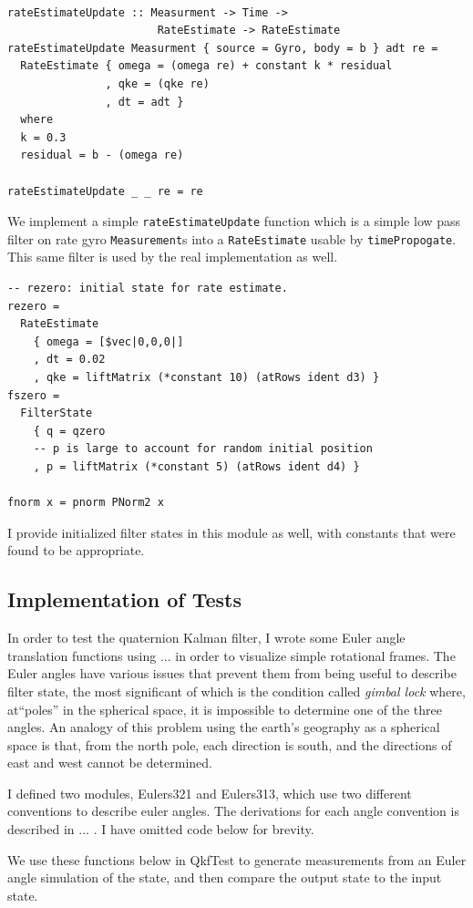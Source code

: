 \documentclass[12pt]{report}
\begin{document}
\begin{lstlisting}

rateEstimateUpdate :: Measurment -> Time -> 
                       RateEstimate -> RateEstimate
rateEstimateUpdate Measurment { source = Gyro, body = b } adt re = 
  RateEstimate { omega = (omega re) + constant k * residual
               , qke = (qke re)
               , dt = adt }
  where 
  k = 0.3
  residual = b - (omega re)

rateEstimateUpdate _ _ re = re 
\end{lstlisting}
We implement a simple \lstinline$rateEstimateUpdate$ function which is a simple low pass filter on rate gyro \lstinline$Measurement$s into a \lstinline$RateEstimate$ usable by \lstinline$timePropogate$. This same filter is used by the real implementation as well.
\begin{lstlisting}
-- rezero: initial state for rate estimate. 
rezero = 
  RateEstimate 
    { omega = [$vec|0,0,0|]
    , dt = 0.02
    , qke = liftMatrix (*constant 10) (atRows ident d3) }
fszero = 
  FilterState 
    { q = qzero
    -- p is large to account for random initial position
    , p = liftMatrix (*constant 5) (atRows ident d4) }

fnorm x = pnorm PNorm2 x
\end{lstlisting}
I provide initialized filter states in this module as well, with constants that were found to be appropriate.

\subsection{Implementation of Tests}
In order to test the quaternion Kalman filter, I wrote some Euler angle translation functions using ... in order to visualize simple rotational frames. The Euler angles have various issues that prevent them from being useful to describe filter state, the most significant of which is the condition called \emph{gimbal lock} where, at``poles'' in the spherical space, it is impossible to determine one of the three angles. An analogy of this problem using the earth's geography as a spherical space is that, from the north pole, each direction is south, and the directions of east and west cannot be determined.

I defined two modules, Eulers321 and Eulers313, which use two different conventions to describe euler angles. The derivations for each angle convention is described in ... . I have omitted code below for brevity.

We use these functions below in QkfTest to generate measurements from an Euler angle simulation of the state, and then compare the output state to the input state.
\end{document}
